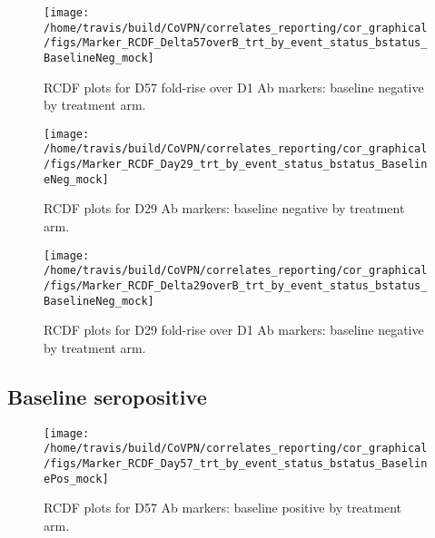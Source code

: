 \documentclass[]{book}
\theoremstyle{definition}
\theoremstyle{definition}
\theoremstyle{definition}
\newcommand{\1}{\mathbbm{1}}
\begin{document}
\clearpage
\begin{figure}[H]

{\centering \texttt{[image: /home/travis/build/CoVPN/correlates\_reporting/cor\_graphical/figs/Marker\_RCDF\_Delta57overB\_trt\_by\_event\_status\_bstatus\_BaselineNeg\_mock]} 

}

\caption{RCDF plots for D57 fold-rise over D1 Ab markers: baseline negative by treatment arm.}\label{fig:unnamed-chunk-14}
\end{figure}

\clearpage
\begin{figure}[H]

{\centering \texttt{[image: /home/travis/build/CoVPN/correlates\_reporting/cor\_graphical/figs/Marker\_RCDF\_Day29\_trt\_by\_event\_status\_bstatus\_BaselineNeg\_mock]} 

}

\caption{RCDF plots for D29 Ab markers: baseline negative by treatment arm.}\label{fig:unnamed-chunk-15}
\end{figure}

\clearpage
\begin{figure}[H]

{\centering \texttt{[image: /home/travis/build/CoVPN/correlates\_reporting/cor\_graphical/figs/Marker\_RCDF\_Delta29overB\_trt\_by\_event\_status\_bstatus\_BaselineNeg\_mock]} 

}

\caption{RCDF plots for D29 fold-rise over D1 Ab markers: baseline negative by treatment arm.}\label{fig:unnamed-chunk-16}
\end{figure}

\hypertarget{baseline-seropositive-1}{%
\subsection{Baseline seropositive}\label{baseline-seropositive-1}}

\begin{figure}[H]

{\centering \texttt{[image: /home/travis/build/CoVPN/correlates\_reporting/cor\_graphical/figs/Marker\_RCDF\_Day57\_trt\_by\_event\_status\_bstatus\_BaselinePos\_mock]} 

}

\caption{RCDF plots for D57 Ab markers: baseline positive by treatment arm.}\label{fig:unnamed-chunk-17}
\end{figure}
\end{document}
